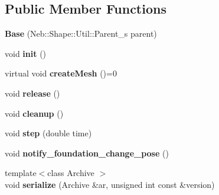 \subsection*{Public Member Functions}
\begin{DoxyCompactItemize}
\item 
\hypertarget{classNeb_1_1Shape_1_1Base_a35afa951586265017239c2ad304a554e}{{\bfseries Base} (Neb\-::\-Shape\-::\-Util\-::\-Parent\-\_\-s parent)}\label{classNeb_1_1Shape_1_1Base_a35afa951586265017239c2ad304a554e}

\item 
\hypertarget{classNeb_1_1Shape_1_1Base_a11dd7e8eefb27d06da70638da87f0900}{void {\bfseries init} ()}\label{classNeb_1_1Shape_1_1Base_a11dd7e8eefb27d06da70638da87f0900}

\item 
\hypertarget{classNeb_1_1Shape_1_1Base_a1e46c36d898482587e96521c38bff294}{virtual void {\bfseries create\-Mesh} ()=0}\label{classNeb_1_1Shape_1_1Base_a1e46c36d898482587e96521c38bff294}

\item 
\hypertarget{classNeb_1_1Shape_1_1Base_a19d7b3eeac560db781b8dd9d7a044bef}{void {\bfseries release} ()}\label{classNeb_1_1Shape_1_1Base_a19d7b3eeac560db781b8dd9d7a044bef}

\item 
\hypertarget{classNeb_1_1Shape_1_1Base_afa4dd91b2963eaac1a01b59ffe4f629a}{void {\bfseries cleanup} ()}\label{classNeb_1_1Shape_1_1Base_afa4dd91b2963eaac1a01b59ffe4f629a}

\item 
\hypertarget{classNeb_1_1Shape_1_1Base_a2fd329c3b4f33590a9e26acf1affcb8d}{void {\bfseries step} (double time)}\label{classNeb_1_1Shape_1_1Base_a2fd329c3b4f33590a9e26acf1affcb8d}

\item 
\hypertarget{classNeb_1_1Shape_1_1Base_a30d28dc76de95cae8d78731c7ff86af8}{void {\bfseries notify\-\_\-foundation\-\_\-change\-\_\-pose} ()}\label{classNeb_1_1Shape_1_1Base_a30d28dc76de95cae8d78731c7ff86af8}

\item 
\hypertarget{classNeb_1_1Shape_1_1Base_ac7fc4a307cbc844fa931322ec26cc20e}{{\footnotesize template$<$class Archive $>$ }\\void {\bfseries serialize} (Archive \&ar, unsigned int const \&version)}\label{classNeb_1_1Shape_1_1Base_ac7fc4a307cbc844fa931322ec26cc20e}

\end{DoxyCompactItemize}
